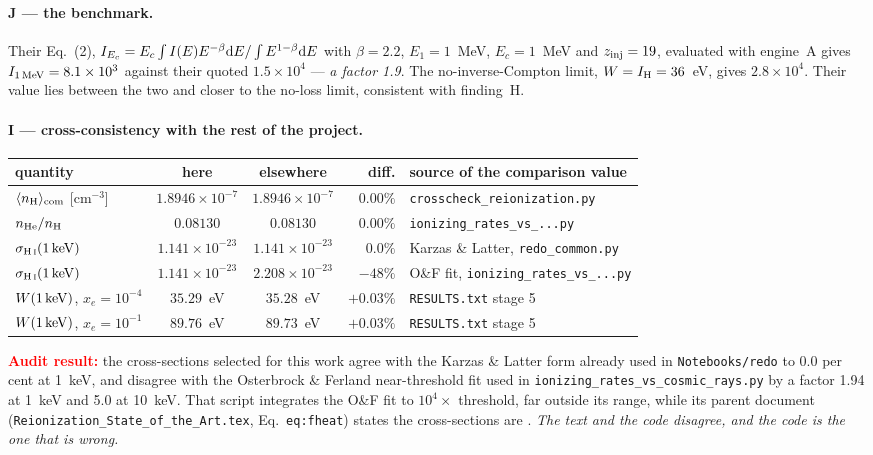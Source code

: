 \documentclass[11pt,a4paper]{article}
\newcommand{\flag}[1]{\textbf{\textcolor{red}{#1}}}
\begin{document}
\paragraph{J --- the \citet{Tueros2014} benchmark.}
Their Eq.~(2), $I_{E_c} = E_c\int I(E)E^{-\beta}{\rm d}E /
\int E^{1-\beta}{\rm d}E$ with $\beta=2.2$, $E_1=1$~MeV, $E_c=1$~MeV and
$z_{\rm inj}=19$, evaluated with engine~A gives
$I_{1\,\rm MeV} = 8.1\times10^{3}$ against their quoted
$1.5\times10^{4}$ --- \emph{a factor 1.9}.  The no-inverse-Compton limit,
$W = I_{\rm H} = 36$~eV, gives $2.8\times10^{4}$.  Their value lies between
the two and closer to the no-loss limit, consistent with finding~H.

\paragraph{I --- cross-consistency with the rest of the project.}
\begin{center}\footnotesize
\begin{tabular}{lccrl}
\toprule
quantity & here & elsewhere & diff. & source of the comparison value \\
\midrule
$\langle n_{\rm H}\rangle_{\rm com}$ [cm$^{-3}$] & $1.8946{\times}10^{-7}$
  & $1.8946{\times}10^{-7}$ & $0.00\%$ & \texttt{crosscheck\_reionization.py} \\
$n_{\rm He}/n_{\rm H}$ & $0.08130$ & $0.08130$ & $0.00\%$
  & \texttt{ionizing\_rates\_vs\_...py} \\
$\sigma_{\rm H\,\textsc{i}}(1\,{\rm keV})$ & $1.141{\times}10^{-23}$
  & $1.141{\times}10^{-23}$ & $0.0\%$ & Karzas \& Latter, \texttt{redo\_common.py} \\
$\sigma_{\rm H\,\textsc{i}}(1\,{\rm keV})$ & $1.141{\times}10^{-23}$
  & $2.208{\times}10^{-23}$ & $-48\%$ & O\&F fit, \texttt{ionizing\_rates\_vs\_...py} \\
$W(1\,{\rm keV})$, $x_e{=}10^{-4}$ & $35.29$~eV & $35.28$~eV & $+0.03\%$
  & \texttt{RESULTS.txt} stage 5 \\
$W(1\,{\rm keV})$, $x_e{=}10^{-1}$ & $89.76$~eV & $89.73$~eV & $+0.03\%$
  & \texttt{RESULTS.txt} stage 5 \\
\bottomrule
\end{tabular}
\end{center}
\flag{Audit result:} the \citet{Verner1996} cross-sections selected for this
work agree with the Karzas \& Latter form already used in
\texttt{Notebooks/redo} to $0.0$ per cent at 1~keV, and disagree with the
Osterbrock \& Ferland near-threshold fit used in
\texttt{ionizing\_\allowbreak rates\_\allowbreak vs\_\allowbreak cosmic\_\allowbreak rays.py} by a factor 1.94 at 1~keV and
5.0 at 10~keV.  That script integrates the O\&F fit to $10^4\times$ threshold,
far outside its range, while its parent document
(\texttt{Reionization\_State\_of\_the\_Art.tex}, Eq.~\texttt{eq:fheat}) states
the cross-sections are \citet{Verner1996}.  \emph{The text and the code
disagree, and the code is the one that is wrong.}
\end{document}
